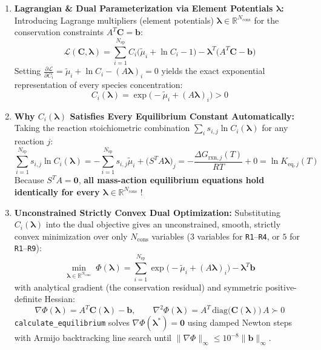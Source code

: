 \documentclass[11pt,a4paper]{article}
\begin{document}
\begin{enumerate}[leftmargin=1.8em]
    \item \textbf{Lagrangian \& Dual Parameterization via Element Potentials $\bm{\lambda}$:}
    Introducing Lagrange multipliers (element potentials) $\bm{\lambda} \in \mathbb{R}^{N_{\text{cons}}}$ for the conservation constraints $A^T \mathbf{C} = \mathbf{b}$:
    \begin{equation}
    \mathcal{L}(\mathbf{C}, \bm{\lambda}) = \sum_{i=1}^{N_{\text{sp}}} C_i \big( \tilde{\mu}_i + \ln C_i - 1 \big) - \bm{\lambda}^T \big( A^T \mathbf{C} - \mathbf{b} \big)
    \end{equation}
    Setting $\frac{\partial \mathcal{L}}{\partial C_i} = \tilde{\mu}_i + \ln C_i - (A\bm{\lambda})_i = 0$ yields the exact exponential representation of every species concentration:
    \begin{equation}
    C_i(\bm{\lambda}) = \exp\!\big( -\tilde{\mu}_i + (A\bm{\lambda})_i \big) > 0
    \end{equation}

    \item \textbf{Why $C_i(\bm{\lambda})$ Satisfies Every Equilibrium Constant Automatically:}
    Taking the reaction stoichiometric combination $\sum_i s_{i,j} \ln C_i(\bm{\lambda})$ for any reaction $j$:
    \begin{equation}
    \sum_{i=1}^{N_{\text{sp}}} s_{i,j} \ln C_i(\bm{\lambda}) = -\sum_{i=1}^{N_{\text{sp}}} s_{i,j} \tilde{\mu}_i + \big(S^T A \bm{\lambda}\big)_j = -\frac{\Delta G_{\text{rxn}, j}(T)}{R T} + 0 = \ln K_{\text{eq}, j}(T)
    \end{equation}
    Because $S^T A = \mathbf{0}$, \textbf{all mass-action equilibrium equations hold identically for every $\bm{\lambda} \in \mathbb{R}^{N_{\text{cons}}}$} !

    \item \textbf{Unconstrained Strictly Convex Dual Optimization:}
    Substituting $C_i(\bm{\lambda})$ into the dual objective gives an unconstrained, smooth, strictly convex minimization over only $N_{\text{cons}}$ variables ($3$ variables for \texttt{R1}--\texttt{R4}, or $5$ for \texttt{R1}--\texttt{R9}):
    \begin{equation}
    \min_{\bm{\lambda} \in \mathbb{R}^{N_{\text{cons}}}} \; \Phi(\bm{\lambda}) = \sum_{i=1}^{N_{\text{sp}}} \exp\!\big( -\tilde{\mu}_i + (A\bm{\lambda})_i \big) - \bm{\lambda}^T \mathbf{b}
    \end{equation}
    with analytical gradient (the conservation residual) and symmetric positive-definite Hessian:
    \begin{equation}
    \nabla \Phi(\bm{\lambda}) = A^T \mathbf{C}(\bm{\lambda}) - \mathbf{b}, \qquad \nabla^2 \Phi(\bm{\lambda}) = A^T \, \text{diag}\big(\mathbf{C}(\bm{\lambda})\big) \, A \succ 0
    \end{equation}
    \texttt{calculate\_\allowbreak{}equilibrium} solves $\nabla \Phi(\bm{\lambda}^*) = \mathbf{0}$ using damped Newton steps with Armijo backtracking line search until $\|\nabla \Phi\|_\infty \le 10^{-8} \|\mathbf{b}\|_\infty$.
\end{enumerate}
\end{document}
